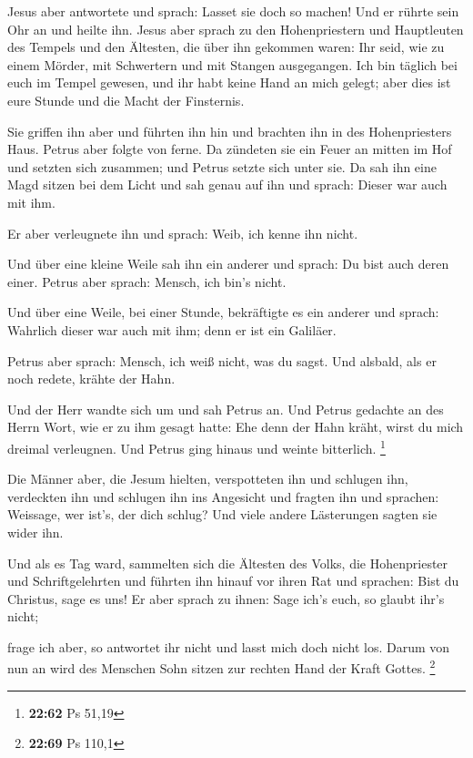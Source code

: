 Jesus aber antwortete und sprach: Lasset sie doch so
machen! Und er rührte sein Ohr an und heilte ihn.  Jesus
aber sprach zu den Hohenpriestern und Hauptleuten des Tempels und den
Ältesten, die über ihn gekommen waren: Ihr seid, wie zu einem Mörder,
mit Schwertern und mit Stangen ausgegangen.  Ich bin
täglich bei euch im Tempel gewesen, und ihr habt keine Hand an mich
gelegt; aber dies ist eure Stunde und die Macht der Finsternis.

 Sie griffen ihn aber und führten ihn hin und brachten
ihn in des Hohenpriesters Haus. Petrus aber folgte von ferne.
 Da zündeten sie ein Feuer an mitten im Hof und setzten
sich zusammen; und Petrus setzte sich unter sie.  Da sah
ihn eine Magd sitzen bei dem Licht und sah genau auf ihn und sprach:
Dieser war auch mit ihm.

 Er aber verleugnete ihn und sprach: Weib, ich kenne ihn
nicht.

 Und über eine kleine Weile sah ihn ein anderer und
sprach: Du bist auch deren einer. Petrus aber sprach: Mensch, ich bin's
nicht.

 Und über eine Weile, bei einer Stunde, bekräftigte es
ein anderer und sprach: Wahrlich dieser war auch mit ihm; denn er ist
ein Galiläer.

 Petrus aber sprach: Mensch, ich weiß nicht, was du
sagst. Und alsbald, als er noch redete, krähte der Hahn.

 Und der Herr wandte sich um und sah Petrus an. Und
Petrus gedachte an des Herrn Wort, wie er zu ihm gesagt hatte: Ehe denn
der Hahn kräht, wirst du mich dreimal verleugnen.  Und
Petrus ging hinaus und weinte bitterlich. \footnote{\textbf{22:62} Ps
  51,19}

 Die Männer aber, die Jesum hielten, verspotteten ihn und
schlugen ihn,  verdeckten ihn und schlugen ihn ins
Angesicht und fragten ihn und sprachen: Weissage, wer ist's, der dich
schlug?  Und viele andere Lästerungen sagten sie wider
ihn.

 Und als es Tag ward, sammelten sich die Ältesten des
Volks, die Hohenpriester und Schriftgelehrten und führten ihn hinauf vor
ihren Rat  und sprachen: Bist du Christus, sage es uns!
Er aber sprach zu ihnen: Sage ich's euch, so glaubt ihr's nicht;

 frage ich aber, so antwortet ihr nicht und lasst mich
doch nicht los.  Darum von nun an wird des Menschen Sohn
sitzen zur rechten Hand der Kraft Gottes. \footnote{\textbf{22:69} Ps
  110,1}

